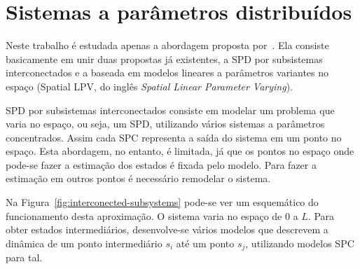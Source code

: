 \pagebreak

\section{Sistemas a parâmetros distribuídos}%
\label{sec:spd}

Neste trabalho é estudada apenas a abordagem proposta
por~\textcite{masterthesis:nelson}. Ela consiste basicamente em unir duas
propostas já existentes, a SPD por subsistemas interconectados e a baseada em
modelos lineares a parâmetros variantes no espaço (Spatial \ac{LPV}, do inglês
\textit{Spatial Linear Parameter Varying}).

SPD por subsistemas interconectados consiste em modelar um problema que varia no
espaço, ou seja, um \ac{SPD}, utilizando vários sistemas a parâmetros
concentrados. Assim cada \ac{SPC} representa a saída do sistema em um ponto no
espaço. Esta abordagem, no entanto, é limitada, já que os pontos no espaço onde
pode-se fazer a estimação dos estados é fixada pelo modelo. Para fazer a
estimação em outros pontos é necessário remodelar o sistema.

Na Figura~\ref{fig:interconected-subsystems} pode-se ver um esquemático do
funcionamento desta aproximação. O sistema varia no espaço de \( 0 \) a \( L \).
Para obter estados intermediários, desenvolve-se vários modelos que descrevem a
dinâmica de um ponto intermediário \( s_i \) até um ponto \( s_j \), utilizando
modelos \ac{SPC} para tal.

